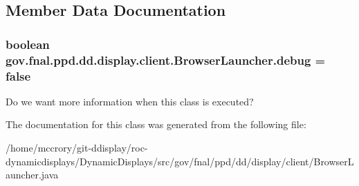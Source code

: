 \subsection{Member Data Documentation}
\hypertarget{classgov_1_1fnal_1_1ppd_1_1dd_1_1display_1_1client_1_1BrowserLauncher_a1e0101712e66f938f905b9b17baf101d}{
\subsubsection[{debug}]{\setlength{\rightskip}{0pt plus 5cm}boolean gov.\-fnal.\-ppd.\-dd.\-display.\-client.\-Browser\-Launcher.\-debug = false\hspace{0.3cm}{\ttfamily [static]}}}\label{classgov_1_1fnal_1_1ppd_1_1dd_1_1display_1_1client_1_1BrowserLauncher_a1e0101712e66f938f905b9b17baf101d}
Do we want more information when this class is executed? 

The documentation for this class was generated from the following file\-:\begin{DoxyCompactItemize}
\item 
/home/mccrory/git-\/ddisplay/roc-\/dynamicdisplays/\-Dynamic\-Displays/src/gov/fnal/ppd/dd/display/client/Browser\-Launcher.\-java\end{DoxyCompactItemize}
